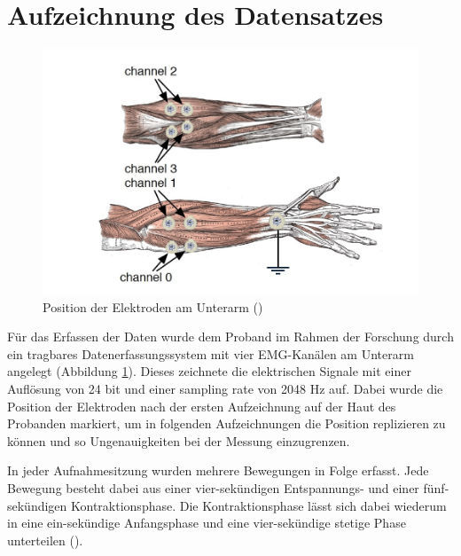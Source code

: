 \section{Aufzeichnung des Datensatzes}
\label{sec:datensatz-aufnahme}

\begin{figure}[h]
	\begin{center}
	\includegraphics[scale=0.17]{grafiken/electrode-positioning.jpg}
	\caption{Position der Elektroden am Unterarm (\cite{Kaufmann2013Data})}
	\label{elektroden-position}
	\end{center}
\end{figure}
Für das Erfassen der Daten wurde dem Proband im Rahmen der Forschung durch \cite{Kaufmann2013Data} ein tragbares Datenerfassungssystem mit vier EMG-Kanälen am Unterarm angelegt (Abbildung \ref{elektroden-position}). Dieses zeichnete die elektrischen Signale mit einer Auflösung von 24 bit und einer sampling rate von 2048 Hz auf. Dabei wurde die Position der Elektroden nach der ersten Aufzeichnung auf der Haut des Probanden markiert, um in folgenden Aufzeichnungen die Position replizieren zu können und so Ungenauigkeiten bei der Messung einzugrenzen. 

In jeder Aufnahmesitzung wurden mehrere Bewegungen in Folge erfasst. Jede Bewegung besteht dabei aus einer vier-sekündigen Entspannungs- und einer fünf-sekündigen Kontraktionsphase. Die Kontraktionsphase lässt sich dabei wiederum in eine ein-sekündige Anfangsphase und eine vier-sekündige stetige Phase unterteilen (\cite{Kaufmann2013Data}). 



